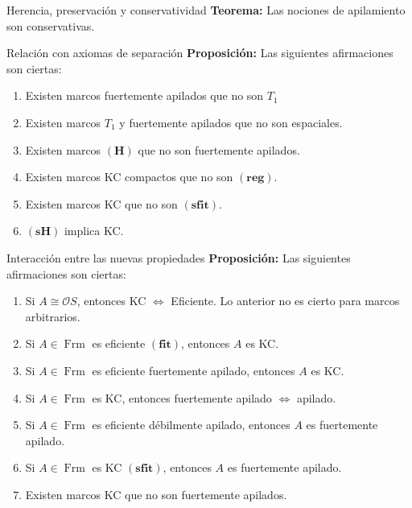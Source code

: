 \documentclass[final]{beamer}
\newlength{\colwidth}
\DeclareMathOperator{\Frm}{Frm}
\newcommand{\separacion}[1]{\textcolor{red!70!black}{\textbf{#1}}}
\begin{document}
\begin{frame}[fragile,t]
\begin{columns}[t]
\begin{column}{\colwidth}
\begin{block}{Herencia, preservación y conservatividad}
\separacion{Teorema:} Las nociones de apilamiento son conservativas.

\end{block}

\begin{alertblock}{Relación con axiomas de separación}
\separacion{Proposición:} Las siguientes afirmaciones son ciertas:
\begin{enumerate}
    \item Existen marcos fuertemente apilados que no son $T_1$
    \item Existen marcos $T_1$ y fuertemente apilados que no son espaciales.
    \item Existen marcos $\mathbf{(H)}$ que no son fuertemente apilados.
    \item Existen marcos KC compactos que no son $\mathbf{(reg)}$.
    \item Existen marcos KC que no son $\mathbf{(sfit)}$.
    \item $\mathbf{(sH)}$ implica KC.
\end{enumerate}
\end{alertblock}

\begin{block}{Interacción entre las nuevas propiedades}
\separacion{Proposición:} Las siguientes afirmaciones son ciertas:
\begin{enumerate}
    \item Si $A\cong \mathcal{O}S$, entonces KC $\iff$ Eficiente. Lo anterior no es cierto
    para marcos arbitrarios.
    \item Si $A\in \Frm$ es eficiente $\mathbf{(fit)}$, entonces $A$ es KC.
    \item Si $A\in \Frm$ es eficiente fuertemente apilado, entonces $A$ es KC.
    \item Si $A\in \Frm$ es KC, entonces fuertemente apilado $\iff$ apilado.
    \item Si $A\in \Frm$ es eficiente débilmente apilado, entonces $A$ es fuertemente apilado.
    \item Si $A\in \Frm$ es KC $\mathbf{(sfit)}$, entonces $A$ es fuertemente apilado.
    \item Existen marcos KC que no son fuertemente apilados. 
\end{enumerate}
\end{block}


\end{column}
\end{columns}
\end{frame}
\end{document}
